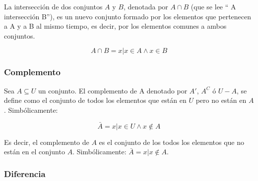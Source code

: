 La intersección de dos conjuntos $A$ y $B$, denotada por $A \cap B$ (que se lee “ A intersección B”),
es un nuevo conjunto formado por los elementos que pertenecen a A y a B al mismo tiempo, es
decir, por los elementos comunes a ambos conjuntos.

\begin{equation}
    A \cap B={x | x \in A \wedge x \in B}
\end{equation}

\begin{figure}[h]
    \centering
\end{figure}

\subsubsection{Complemento}

Sea $A \subseteq U$ un conjunto. El complemento de A denotado por $A'$, $A^C$ ó $U-A$, se define
como el conjunto de todos los elementos que están en $U$ pero no están en $A$.
Simbólicamente:

\begin{equation}
    \bar{A}= {x | x \in U \wedge x \notin A}
\end{equation}

Es decir, el complemento de $A$ es el conjunto de los todos los elementos que no
están en el conjunto $A$. Simbólicamente: $ \bar{A}={x | x \notin A}$.

\subsubsection{Diferencia}

